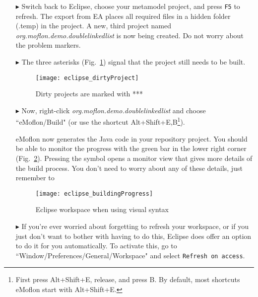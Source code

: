 \begin{itemize}
\item[$\blacktriangleright$] Switch back to Eclipse, choose your metamodel project, and press \texttt{F5} to refresh. 
The export from EA places all required files in a hidden folder (.temp) in the project.
A new, third project named \emph{org.moflon.demo.doublelinkedlist} is now being created.
Do not worry about the problem markers.

\item[$\blacktriangleright$] The three asterisks (Fig.~\ref{eclipse:dirty-project}) signal that the project still needs to be built.

\vspace{0.5cm}

\begin{figure}[htbp]
    \centering
    \texttt{[image: eclipse\_dirtyProject]}
    \caption{Dirty projects are marked with ***} 
    \label{eclipse:dirty-project} 
\end{figure}

\vspace{0.5cm}

\item[$\blacktriangleright$] Now, right-click \emph{org.moflon.demo.doublelinkedlist} and choose ``eMoflon/Build" (or use the shortcut Alt+Shift+E,B\footnote{First press Alt+Shift+E, release, and press B.
By default, most shortcuts eMoflon start with Alt+Shift+E.}).

eMoflon now generates the Java code in your repository project.
You should be able to monitor the progress with the green bar in the lower right corner (Fig.~\ref{eclipse:build}). Pressing the
symbol opens a monitor view that gives more details of the build process. You don't need to worry about any of these details, just remember to 


\begin{figure}[htbp]
    \centering
    \texttt{[image: eclipse\_buildingProgress]}
    \caption{Eclipse workspace when using visual syntax} 
    \label{eclipse:build} 
\end{figure}

\item[$\blacktriangleright$] If you're ever worried about forgetting to refresh your workspace, or if you just don't want to bother with having to do this,
Eclipse does offer an option to do it for you automatically. To activate this, go to ``Window/Preferences/General/Workspace" and select \texttt{Refresh on
access}.

\end{itemize}